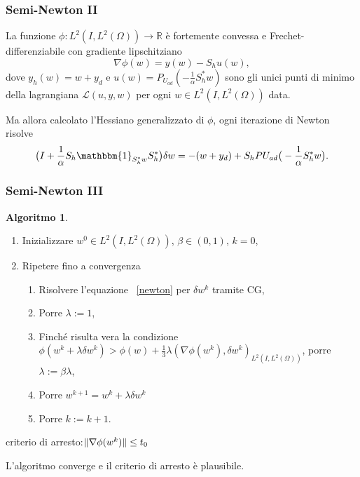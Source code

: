 \documentclass{beamer}
\theoremstyle{definition}
\theoremstyle{remark}
\theoremstyle{plain}
\theoremstyle{definition}
\newtheorem{algoritmo}{Algoritmo}
\DeclarePairedDelimiter{\norma}{\lVert}{\rVert}
\newcommand{\numberset}{\mathbb}
\newcommand{\R}{\numberset{R}}
\begin{document}
\begin{frame}
\frametitle{Semi-Newton II}
\begin{lemma}
La funzione $ \phi:L^2(I,L^2(\Omega))\to\R $  è fortemente convessa e Frechet-differenziabile con gradiente lipschitziano
\begin{equation}
\nabla\phi(w)=y(w)-S_hu(w),
\end{equation}
dove $ y_h(w)=w+y_d $ e $ u(w)=P_{U_{ad}}(-\frac{1}{\alpha}S^*_hw) $ sono gli unici punti di minimo della lagrangiana $ \mathcal{L}(u,y,w) $ per ogni $ w\in L^2(I,L^2(\Omega)) $ data.
\end{lemma}
Ma allora calcolato l'Hessiano generalizzato di $ \phi $, ogni iterazione di Newton risolve
\begin{equation}
\label{newton}
\big( I + \frac{1}{\alpha}S_h\mathbbm{1}_{S^*_hw}S^*_h\big)\delta w=-(w+y_d)+S_hP{U_{ad}}\big( -\frac{1}{\alpha}S^*_hw\big).
\end{equation}
\end{frame}

\begin{frame}
\frametitle{Semi-Newton III}
\begin{algoritmo}
\begin{enumerate}
\item Inizializzare $ w^0\in L^2(I,L^2(\Omega)) $, $\beta\in(0,1) $, $ k=0 $, 
\item Ripetere fino a convergenza
          \begin{enumerate}
          \item Risolvere l'equazione ~\eqref{newton} per $ \delta w^k $ tramite CG,
          \item Porre $ \lambda:=1 $,
          \item Finché risulta vera la condizione $ \phi(w^k+\lambda\delta w^k) > \phi(w) + \frac{1}{3}\lambda(\nabla\phi(w^k),\delta w^k)_{L^2(I,L^2(\Omega))} $, porre $ \lambda:=\beta\lambda $,
          \item Porre $ w^{k+1}=w^k + \lambda\delta w^k $
         \item Porre $ k:=k+1 $.
          \end{enumerate}
\end{enumerate}
criterio di arresto:$ \norma{\nabla\phi(w^k)}\le t_0 $
\end{algoritmo}
L'algoritmo converge e il criterio di arresto è plausibile.
\end{frame}
\end{document}
